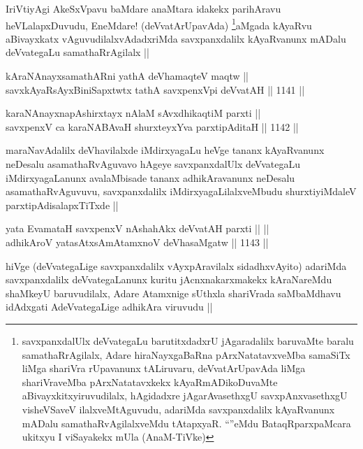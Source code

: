\begin{artha}
IriVtiyAgi AkeSxVpavu baMdare anaMtara idakekx parihAravu heVLalapxDuvudu, EneMdare! (deVvatArUpavAda) \footnote{savxpanxdalUlx deVvategaLu barutitxdadxrU jAgaradalilx baruvaMte baralu samathaRrAgilalx, Adare hiraNayxgaBaRna pArxNatatavxveMba samaSiTx liMga shariVra rUpavanunx tALiruvaru, deVvatArUpavAda liMga shariVraveMba pArxNatatavxkekx kAyaRmADikoDuvaMte aBivayxkitxyiruvudilalx, hAgidadxre jAgarAvasethxgU savxpAnxvasethxgU visheVSaveV ilalxveMtAguvudu, adariMda savxpanxdalilx kAyaRvanunx mADalu samathaRvAgilalxveMdu tAtapxyaR. ``\stext''eMdu BataqRparxpaMcara ukitxyu I viSayakekx mUla (AnaM-TiVke)}aMgada kAyaRvu aBivayxkatx vAguvudilalxvAdadxriMda savxpanxdalilx kAyaRvanunx mADalu deVvategaLu samathaRrAgilalx ||
\end{artha}


\begin{shl}
kAraNAnayxsamathARni yathA deVhamaqteV maqtw || \\
savxkAyaRsAyxBiniSapxtwtx tathA savxpenxV\s pi deVvatAH ||  1141 ||  
\end{shl}
				
\begin{shl}
karaNAnayxnapAshirxtayx nAlaM sAvxdhikaqtiM parxti ||  \\
savxpenxV ca karaNABAvaH shurxteyxYva parxtipAditaH ||  1142 ||  
\end{shl}

\begin{artha}
maraNavAdalilx deVhavilalxde iMdirxyagaLu heVge tananx kAyaRvanunx neDesalu asamathaRvAguvavo hAgeye savxpanxdalUlx deVvategaLu iMdirxyagaLanunx avalaMbisade tananx adhikAravanunx neDesalu asamathaRvAguvuvu, savxpanxdalilx iMdirxyagaLilalxveMbudu shurxtiyiMdaleV parxtipAdisalapxTiTxde ||
\end{artha}

\begin{shl}
yata EvamataH savxpenxV nA\s \s shahAkx deVvatAH parxti ||  || \\
adhikAroV yatasAtxsAmAtamxnoV deVhasaMgatw ||  1143 ||  
\end{shl}

\begin{artha}
hiVge (deVvategaLige savxpanxdalilx vAyxpAravilalx sidadhxvAyito) adariMda savxpanxdalilx deVvategaLanunx kuritu jAcnxnakarxmakekx kAraNareMdu shaMkeyU baruvudilalx, Adare Atamxnige sUthxla shariVrada saMbaMdhavu idAdxgati AdeVvategaLige adhikAra viruvudu ||
\end{artha}

